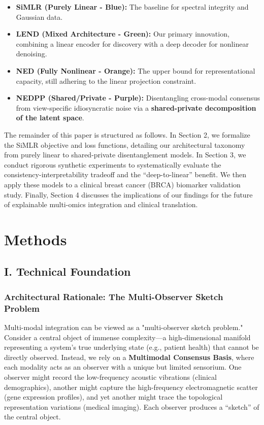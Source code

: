 \documentclass[
  letterpaper,
]{report}
\providecommand{\tightlist}{%
  \setlength{\itemsep}{0pt}\setlength{\parskip}{0pt}}
\begin{document}
\begin{itemize}
\tightlist
\item
  {\textbf{SiMLR (Purely Linear - Blue):}} The baseline for spectral
  integrity and Gaussian data.
\item
  {\textbf{LEND (Mixed Architecture - Green):}} Our primary innovation,
  combining a linear encoder for discovery with a deep decoder for
  nonlinear denoising.
\item
  {\textbf{NED (Fully Nonlinear - Orange):}} The upper bound for
  representational capacity, still adhering to the linear projection
  constraint.
\item
  {\textbf{NEDPP (Shared/Private - Purple):}} Disentangling cross-modal
  consensus from view-specific idiosyncratic noise via a
  \textbf{shared-private decomposition of the latent space}.
\end{itemize}

The remainder of this paper is structured as follows. In Section 2, we
formalize the SiMLR objective and loss functions, detailing our
architectural taxonomy from purely linear to shared-private
disentanglement models. In Section 3, we conduct rigorous synthetic
experiments to systematically evaluate the consistency-interpretability
tradeoff and the ``deep-to-linear'' benefit. We then apply these models
to a clinical breast cancer (BRCA) biomarker validation study. Finally,
Section 4 discusses the implications of our findings for the future of
explainable multi-omics integration and clinical translation.


\chapter{Methods}\label{methods}

\section{I. Technical Foundation}\label{i.-technical-foundation}

\subsection{Architectural Rationale: The Multi-Observer Sketch
Problem}\label{architectural-rationale-the-multi-observer-sketch-problem}

Multi-modal integration can be viewed as a "multi-observer sketch
problem." Consider a central object of immense complexity---a
high-dimensional manifold representing a system's true underlying state
(e.g., patient health) that cannot be directly observed. Instead, we
rely on a \textbf{Multimodal Consensus Basis}, where each modality acts
as an observer with a unique but limited sensorium. One observer might
record the low-frequency acoustic vibrations (clinical demographics),
another might capture the high-frequency electromagnetic scatter (gene
expression profiles), and yet another might trace the topological
representation variations (medical imaging). Each observer produces a
``sketch'' of the central object.
\end{document}
